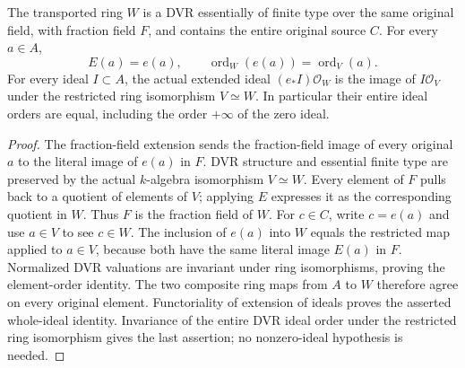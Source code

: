 \begin{lemma}
\label{lem:c0n-chart-dvr-transport-maps}
\leanok
The transported ring $W$ is a DVR essentially of finite type over the
same original field, with fraction field $F$, and contains the entire
original source $C$.  For every $a\in A$,
\[
 E(a)=e(a),\qquad
 \operatorname{ord}_W(e(a))=\operatorname{ord}_V(a).
\]
For every ideal $I\subset A$, the actual extended ideal
$(e_*I)\mathcal O_W$ is the image of $I\mathcal O_V$ under the restricted
ring isomorphism $V\simeq W$.  In particular their entire ideal orders
are equal, including the order $+\infty$ of the zero ideal.
\end{lemma}
\begin{proof}
The fraction-field extension sends the fraction-field image of every
original $a$ to the literal image of $e(a)$ in $F$.
DVR structure and essential finite type are preserved by the actual
$k$-algebra isomorphism $V\simeq W$.
Every element of $F$ pulls back to a quotient of elements of $V$;
applying $E$ expresses it as the corresponding quotient in $W$.
Thus $F$ is the fraction field of $W$.
For $c\in C$, write $c=e(a)$ and use $a\in V$ to see $c\in W$.
The inclusion of $e(a)$ into $W$ equals the restricted map applied to
$a\in V$, because both have the same literal image $E(a)$ in $F$.
Normalized DVR valuations are invariant under ring isomorphisms, proving
the element-order identity.  The two composite ring maps from $A$ to $W$
therefore agree on every original element.  Functoriality of extension
of ideals proves the asserted whole-ideal identity.  Invariance of the
entire DVR ideal order under the restricted ring isomorphism gives the
last assertion; no nonzero-ideal hypothesis is needed.
\end{proof}


